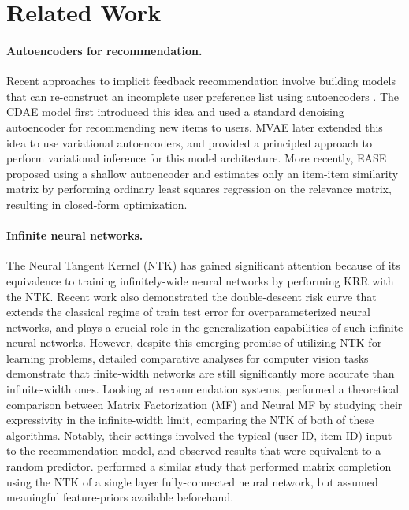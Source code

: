 \documentclass{article}
\begin{document}
\section{Related Work}
\paragraph{Autoencoders for recommendation.} Recent approaches to implicit feedback recommendation involve building models that can re-construct an incomplete user preference list using autoencoders \cite{mvae, ease, svae, macridvae}. The CDAE model \cite{cdae} first introduced this idea and used a standard denoising autoencoder for recommending new items to users. MVAE \cite{mvae} later extended this idea to use variational autoencoders, and provided a principled approach to perform variational inference for this model architecture. More recently, EASE \cite{ease} proposed using a shallow autoencoder and estimates only an item-item similarity matrix by performing ordinary least squares regression on the relevance matrix, resulting in closed-form optimization.



\paragraph{Infinite neural networks.} The Neural Tangent Kernel (NTK) \cite{ntk} has gained significant attention because of its equivalence to training infinitely-wide neural networks by performing KRR with the NTK. Recent work also demonstrated the double-descent risk curve \cite{double_descent} that extends the classical regime of train \vs test error for overparameterized neural networks, and plays a crucial role in the generalization capabilities of such infinite neural networks. However, despite this emerging promise of utilizing NTK for learning problems, detailed comparative analyses \cite{finite_vs_infinite_1, finite_vs_infinite_2, finite_vs_infinite_3} for computer vision tasks demonstrate that finite-width networks are still significantly more accurate than infinite-width ones. Looking at recommendation systems, \cite{rethinking_ntk} performed a theoretical comparison between Matrix Factorization (MF) and Neural MF \cite{neural_mf} by studying their expressivity in the infinite-width limit, comparing the NTK of both of these algorithms. Notably, their settings involved the typical (user-ID, item-ID) input to the recommendation model, and observed results that were equivalent to a random predictor. \cite{matrix_completion_ntk} performed a similar study that performed matrix completion using the NTK of a single layer fully-connected neural network, but assumed meaningful feature-priors available beforehand.
\end{document}
